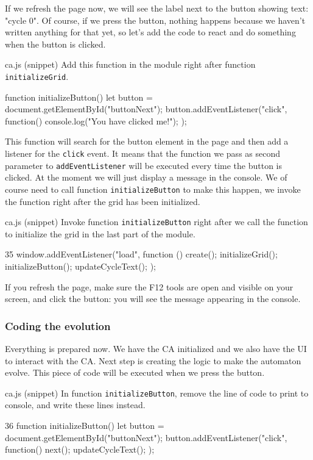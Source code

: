 If we refresh the page now, we will see the label next to the button showing text: "cycle 0". Of course,
if we press the button, nothing happens because we haven't written anything for that yet, so let's add
the code to react and do something when the button is clicked.

\begin{programcode}{ca.js (snippet)}
Add this function in the module right after function \texttt{initializeGrid}.
\begin{code}
function initializeButton() {
  let button = document.getElementById("buttonNext");
  button.addEventListener("click", function(){
    console.log("You have clicked me!");
  });
}
\end{code}
\end{programcode}

This function will search for the button element in the page and then add a listener for the \texttt{click}
event. It means that the function we pass as second parameter to \texttt{addEventListener} will be executed
every time the button is clicked. At the  moment we will just display a message in the console. We
of course need to call function \texttt{initializeButton} to make this happen, we invoke the function
right after the grid has been initialized.

\begin{programcode}{ca.js (snippet)}
Invoke function \texttt{initializeButton} right after we call the function to initialize the grid in
the last part of the module.
\begin{codeh1}{3}{5}
window.addEventListener("load", function () {
  create();
  initializeGrid();
  initializeButton();
  updateCycleText();
});
\end{codeh1}
\end{programcode}

If you refresh the page, make sure the F12 tools are open and visible on your screen, and click the button:
you will see the message appearing in the console.

\subsubsection{Coding the evolution}
Everything is prepared now. We have the CA initialized and we also have the UI to interact with the CA.
Next step is creating the logic to make the automaton evolve.
This piece of code will be executed when we press the button.

\begin{programcode}{ca.js (snippet)}
In function \texttt{initializeButton}, remove the line of code to print to console, and write these lines
instead.
\begin{codeh1}{3}{6}
function initializeButton() {
  let button = document.getElementById("buttonNext");
  button.addEventListener("click", function(){
    next();
    updateCycleText();
  });
}
\end{codeh1}
\end{programcode}

